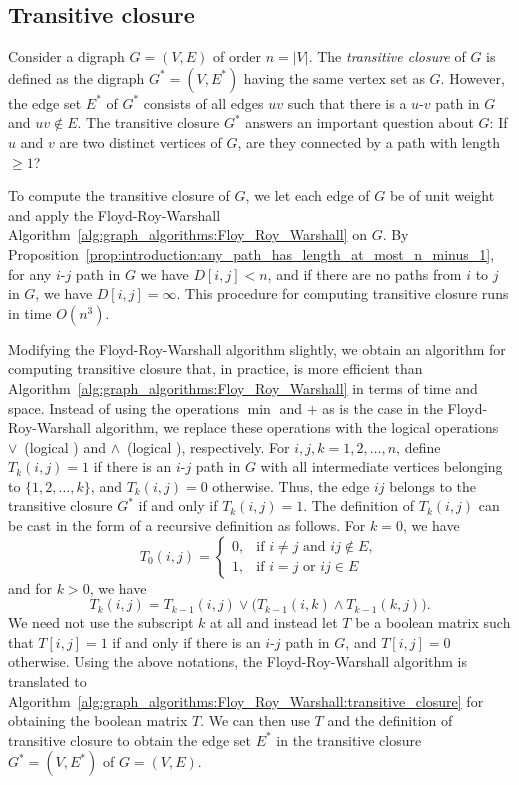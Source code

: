 
\subsection{Transitive closure}

Consider a digraph $G = (V, E)$ of order $n = |V|$. The
\emph{transitive closure} of $G$ is defined
as the digraph $G^* = (V, E^*)$ having the same vertex set as
$G$. However, the edge set $E^*$ of $G^*$ consists of all edges $uv$
such that there is a $u$-$v$ path in $G$ and $uv \notin E$. The
transitive closure $G^*$ answers an important question about $G$: If
$u$ and $v$ are two distinct vertices of $G$, are they connected by a
path with length $\geq 1$?

To compute the transitive closure of $G$, we let each edge of $G$ be
of unit weight and apply the
Floyd-Roy-Warshall
Algorithm~\ref{alg:graph_algorithms:Floy_Roy_Warshall} on $G$. By
Proposition~\ref{prop:introduction:any_path_has_length_at_most_n_minus_1},
for any $i$-$j$ path in $G$ we have $D[i,j] < n$, and if there are no
paths from $i$ to $j$ in $G$, we have $D[i,j] = \infty$. This
procedure for computing transitive closure runs in time $O(n^3)$.

Modifying the Floyd-Roy-Warshall
algorithm slightly, we obtain an
algorithm for computing transitive closure
that, in practice, is more efficient than
Algorithm~\ref{alg:graph_algorithms:Floy_Roy_Warshall} in terms of
time and space. Instead of using the operations $\min$ and $+$ as is
the case in the Floyd-Roy-Warshall
algorithm, we replace these
operations with the logical operations $\vee$~(logical \OR) and
$\wedge$~(logical \AND), respectively. For $i,j,k = 1, 2, \dots, n$,
define $T_k(i,j) = 1$ if there is an $i$-$j$ path in $G$ with all
intermediate vertices belonging to $\{1, 2, \dots, k\}$, and
$T_k(i,j) = 0$ otherwise. Thus, the edge $ij$ belongs to the
transitive closure $G^*$ if and only if $T_k(i,j) = 1$. The definition
of $T_k(i,j)$ can be cast in the form of a recursive definition as
follows. For $k = 0$, we have
\[
T_0(i,j)
=
\begin{cases}
0, & \text{if $i \neq j$ and $ij \notin E$}, \\[4pt]
1, & \text{if $i = j$ or $ij \in E$}
\end{cases}
\]
and for $k > 0$, we have
\[
T_k(i,j)
=
T_{k-1}(i,j) \vee \big( T_{k-1}(i,k) \wedge T_{k-1}(k,j) \big).
\]
We need not use the subscript $k$ at all and instead let $T$ be a
boolean matrix such that $T[i,j] = 1$ if and only if there is an
$i$-$j$ path in $G$, and $T[i,j] = 0$ otherwise. Using the above
notations, the Floyd-Roy-Warshall
algorithm is translated to
Algorithm~\ref{alg:graph_algorithms:Floy_Roy_Warshall:transitive_closure}
for obtaining the boolean matrix $T$. We can then use $T$ and the
definition of transitive closure to obtain
the edge set $E^*$ in the transitive closure $G^* = (V, E^*)$ of
$G = (V, E)$.

